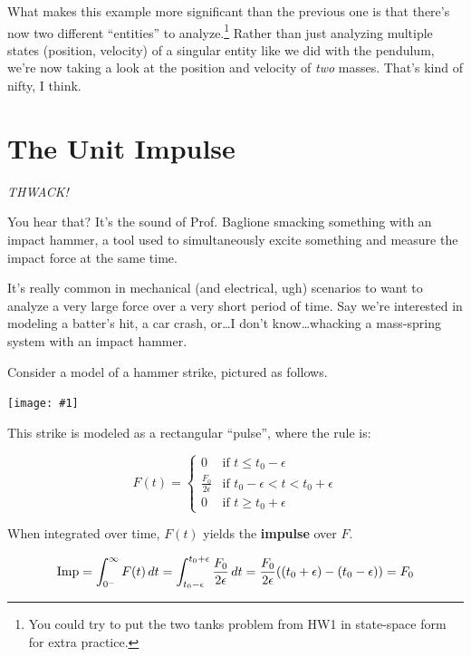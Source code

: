 \documentclass{report}
\newcommand{\bicture}[1]{
\begin{center}
    {\texttt{[image: \#1]}}
\end{center}}
\begin{document}
\begin{onehalfspacing}
\begin{flushleft}
\medskip

What makes this example more significant than the previous one is that there's now two different ``entities'' to analyze.\footnote{You could try to put the two tanks problem from HW1 in state-space form for extra practice.} Rather than just analyzing multiple states (position, velocity) of a singular entity like we did with the pendulum, we're now taking a look at the position and velocity of \textit{two} masses. That's kind of nifty, I think.

\section{The Unit Impulse}

\textit{THWACK!}

\medskip

You hear that? It's the sound of Prof. Baglione smacking something with an impact hammer, a tool used to simultaneously excite something and measure the impact force at the same time.

\medskip

It's really common in mechanical (and electrical, ugh) scenarios to want to analyze a very large force over a very short period of time. Say we're interested in modeling a batter's hit, a car crash, or\dots I don't know\dots whacking a mass-spring system with an impact hammer.

\medskip

Consider a model of a hammer strike, pictured as follows.

\bicture{8_impulse}

This strike is modeled as a rectangular ``pulse'', where the rule is:

\vspace{-0.1in}
\[F(t) = \begin{cases}
    0 & \text{if } t \leq t_0 - \epsilon \\
    \frac{F_0}{2\epsilon} & \text{if } t_0 - \epsilon < t < t_0 + \epsilon \\
    0 & \text{if } t \ge t_0 + \epsilon
\end{cases}\]

When integrated over time, \(F(t)\) yields the \textbf{impulse} over \(F\).

\vspace{-0.1in}
\[\text{Imp} = \int_{0^-}^{\infty} F(t) \, dt = \int_{t_0 - \epsilon}^{t_0 + \epsilon} \frac{F_0}{2\epsilon} \, dt = \frac{F_0}{2\epsilon} \qty((t_0 + \epsilon)-(t_0 - \epsilon)) = F_0\]


\end{flushleft}
\end{onehalfspacing}
\end{document}
